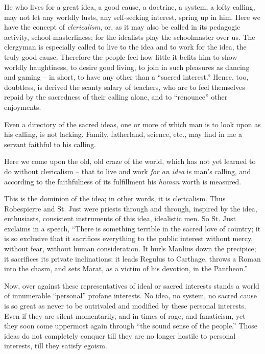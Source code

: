 He who lives for a great idea, a good cause, a doctrine, a system, a lofty 
calling, may not let any worldly lusts, any self-seeking interest, spring up 
in him. Here we have the concept of \textit{clericalism}, or, as it may also 
be called in its pedagogic activity, school-masterliness; for the idealists 
play the schoolmaster over us. The clergyman is especially called to live to 
the idea and to work for the idea, the truly good cause. Therefore the people 
feel how little it befits him to show worldly haughtiness, to desire good 
living, to join in such pleasures as dancing and gaming -- in short, to have 
any other than a ``sacred interest.'' Hence, too, doubtless, is derived the 
scanty salary of teachers, who are to feel themselves repaid by the sacredness 
of their calling alone, and to ``renounce'' other enjoyments.

Even a directory of the sacred ideas, one or more of which man is to look upon 
as his calling, is not lacking. Family, fatherland, science, etc., may find in 
me a servant faithful to his calling.

Here we come upon the old, old craze of the world, which has not yet learned 
to do without clericalism -- that to live and work \textit{for an idea} is 
man's calling, and according to the faithfulness of its fulfillment his 
\textit{human} worth is measured.

This is the dominion of the idea; in other words, it is clericalism. Thus 
Robespierre and St. Just were priests through and through, inspired by the 
idea, enthusiasts, consistent instruments of this idea, idealistic men. So St. 
Just exclaims in a speech, ``There is something terrible in the sacred love 
of country; it is so exclusive that it sacrifices everything to the public 
interest without mercy, without fear, without human consideration. It hurls 
Manlius down the precipice; it sacrifices its private inclinations; it leads 
Regulus to Carthage, throws a Roman into the chasm, and sets Marat, as a 
victim of his devotion, in the Pantheon.''

Now, over against these representatives of ideal or sacred interests stands a 
world of innumerable ``personal'' profane interests. No idea, no system, no 
sacred cause is so great as never to be outrivaled and modified by these 
personal interests. Even if they are silent momentarily, and in times of rage, 
and fanaticism, yet they soon come uppermost again through ``the sound sense 
of the people.'' Those ideas do not completely conquer till they are no 
longer hostile to personal interests, till they satisfy egoism.

